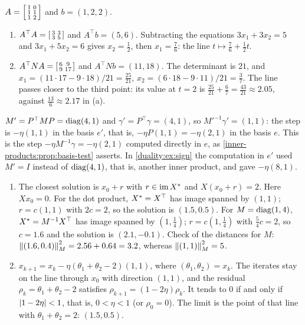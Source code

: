 $A = \begin{bsmallmatrix}1 & 0\\1 & 1\\1 & 2\end{bsmallmatrix}$ and
$b = (1, 2, 2)$.
\begin{enumerate}[nosep]
  \item[(a)] $A^\top A = \begin{bsmallmatrix}3 & 3\\3 & 5\end{bsmallmatrix}$
        and $A^\top b = (5, 6)$. Subtracting the equations
        $3x_1 + 3x_2 = 5$ and $3x_1 + 5x_2 = 6$ gives $x_2 = \frac12$, then
        $x_1 = \frac76$: the line $t\mapsto\frac76 + \frac12t$.
  \item[(b)] $A^\top NA = \begin{bsmallmatrix}6 & 9\\9 & 17
        \end{bsmallmatrix}$ and $A^\top Nb = (11, 18)$. The determinant is
        $21$, and $x_1 = (11\cdot17 - 9\cdot18)/21 = \frac{25}{21}$,
        $x_2 = (6\cdot18 - 9\cdot11)/21 = \frac37$. The line passes closer
        to the third point: its value at $t = 2$ is
        $\frac{25}{21} + \frac67 = \frac{43}{21}\approx2.05$, against
        $\frac{13}6\approx2.17$ in (a).
\end{enumerate}

$M' = P^\top MP = \operatorname{diag}(4, 1)$ and $\gamma' = P^\top\gamma = (4, 1)$, so
$M'^{-1}\gamma' = (1, 1)$: the step is $-\eta(1, 1)$ in the basis $e'$,
that is, $-\eta P(1, 1) = -\eta(2, 1)$ in the basis $e$. This is the step
$-\eta M^{-1}\gamma = -\eta(2, 1)$ computed directly in $e$, as
\cref{inner-products:prop:basis-test} asserts. In
\cref{duality:ex:sign} the computation in $e'$ used $M' = I$ instead of
$\operatorname{diag}(4, 1)$, that is, another inner product, and gave $-\eta(8, 1)$.

\begin{enumerate}[nosep]
  \item The closest solution is $x_0 + r$ with $r\in\operatorname{im}X^{*}$ and
        $X(x_0 + r) = 2$. Here $Xx_0 = 0$. For the dot product,
        $X^{*} = X^\top$ has image spanned by $(1, 1)$; $r = c(1, 1)$
        with $2c = 2$, so the solution is $(1.5, 0.5)$. For
        $M = \operatorname{diag}(1, 4)$, $X^{*} = M^{-1}X^\top$ has image spanned by
        $(1, \frac14)$; $r = c(1, \frac14)$ with $\frac54c = 2$, so
        $c = 1.6$ and the solution is $(2.1, -0.1)$. Check of the
        distances for $M$: $\left\|(1.6, 0.4)\right\|_M^2 = 2.56 + 0.64 = 3.2$,
        whereas $\left\|(1, 1)\right\|_M^2 = 5$.
  \item $x_{k+1} = x_k - \eta(\theta_1 + \theta_2 - 2)(1, 1)$, where
        $(\theta_1, \theta_2) = x_k$. The iterates stay on the line
        through $x_0$ with direction $(1, 1)$, and the residual
        $\rho_k = \theta_1 + \theta_2 - 2$ satisfies
        $\rho_{k+1} = (1 - 2\eta)\rho_k$. It tends to $0$ if and only if
        $\left|1 - 2\eta\right| < 1$, that is, $0 < \eta < 1$ (or $\rho_0 = 0$).
        The limit is the point of that line with
        $\theta_1 + \theta_2 = 2$: $(1.5, 0.5)$.
\end{enumerate}

